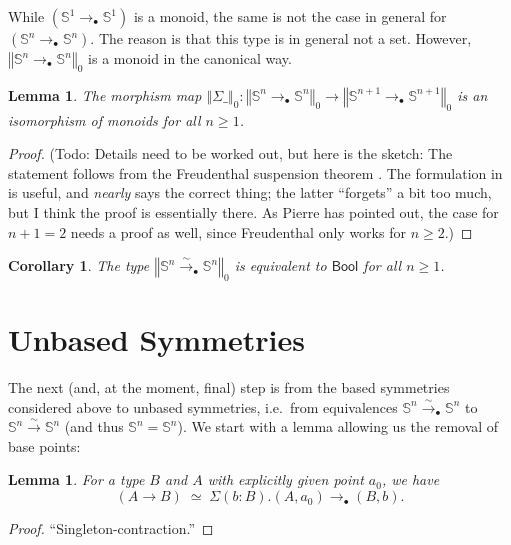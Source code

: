\documentclass[11pt,a4paper,oneside,reqno]{amsart}
\newtheorem{lemma}[theorem]{Lemma}
\newtheorem{corollary}[theorem]{Corollary}
\theoremstyle{definition}
\theoremstyle{remark}
\newcommand{\sph}[1]{{\mathbb S}^{#1}}
\newcommand{\trunc}[2]{\mathopen{}\left\Vert #2\right\Vert_{#1}\mathclose{}}
\newcommand{\pointedm}{\rightarrow_\bullet}
\begin{document}
While $(\sph 1 \pointedm \sph 1)$ is a monoid, the same is not the case in general for $(\sph n \pointedm \sph n)$.
The reason is that this type is in general not a set.
However,
$\trunc 0 {\sph n \pointedm \sph n}$ is a monoid in the canonical way.

\begin{lemma} \label{lem:grp-iso}
 The morphism map $\trunc 0 {\Sigma \_} : \trunc 0 {\sph n \pointedm \sph n} \to \trunc 0 {\sph {n+1} \pointedm \sph {n+1}}$ is an isomorphism of monoids for all $n \geq 1$.
\end{lemma}
\begin{proof}
 (Todo: Details need to be worked out, but here is the sketch: The statement follows from the Freudenthal suspension theorem \cite[Thm 8.6.4]{HoTT}. The formulation in \cite[Cor 8.6.14]{HoTT} is useful, and \cite[Thm 8.6.17]{HoTT} \emph{nearly} says the correct thing; the latter ``forgets'' a bit too much, but I think the proof is essentially there. As Pierre has pointed out, the case for $n + 1 = 2$ needs a proof as well, since Freudenthal only works for $n \geq 2$.)
\end{proof}


\begin{corollary} \label{cor:Sn-bool}
 The type
 $\trunc 0 {\sph n \xrightarrow{\sim}_\bullet \sph n}$
is equivalent to $\mathsf{Bool}$ for all $n \geq 1$.
\end{corollary}

\section{Unbased Symmetries}

The next (and, at the moment, final) step is from the based symmetries considered above to unbased symmetries, i.e.\ from equivalences $\sph n \xrightarrow{\sim}_\bullet \sph n$ to $\sph n \xrightarrow{\sim} \sph n$ (and thus $\sph n = \sph n$).
We start with a lemma allowing us the removal of base points:
\begin{lemma} \label{lem:rm-base-points}
 For a type $B$ and $A$ with explicitly given point $a_0$, we have
 \begin{equation}
  (A \to B) \; \simeq  \; \Sigma (b : B). (A,a_0) \to_\bullet (B,b).
 \end{equation}
\end{lemma}
\begin{proof}
 ``Singleton-contraction.''
\end{proof}
\end{document}
